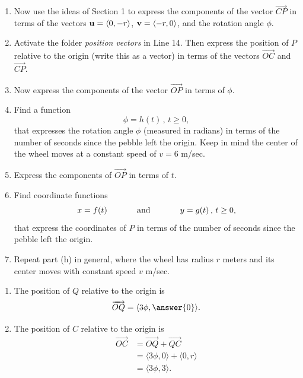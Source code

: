 \documentclass{ximera}
\begin{document}
\begin{question}
\begin{enumerate}
\item Now use the ideas of Section 1 to express the components of the vector $\overrightarrow{CP}$ in terms of the vectors ${\bf u}=\langle 0,-r \rangle$, ${\bf v}=\langle -r,0 \rangle $, and the rotation angle $\phi$.


\item Activate the folder \emph{position vectors} in Line 14. Then express the position of $P$ relative to the origin (write this as a vector) in terms of the vectors $\overrightarrow{OC}$ and $\overrightarrow{CP}$.

\item Now express the components of the vector $\overrightarrow{OP}$ in terms of $\phi$.

\item Find a function 
\[
   \phi = h(t)  \, , \, t\geq 0, 
\]
that expresses the rotation angle $\phi$ (measured in radians) in terms of the number of seconds since the pebble left the origin. Keep in mind the center of the wheel moves at a constant speed of $v=6$ m/sec.

\item Express the components of $\overrightarrow{OP}$ in terms of $t$.

\item Find coordinate functions
\[
    x=f(t)   \hskip 0.5in \text{and} \hskip 0.5in y=g(t) \, , \, t\geq 0 ,
\]
that express the coordinates of $P$ in terms of the number of seconds since the pebble left the origin.

\item Repeat part (h) in general, where the wheel has radius $r$ meters and its center moves with constant speed $v$ m/sec.
\end{enumerate}

\begin{explanation}
\begin{enumerate}
\item The position of $Q$ relative to the origin is
\[
  \overrightarrow{OQ} = \langle  3\phi , \answer{0} \rangle. 
\]

\item The position of $C$ relative to the origin is
\begin{align*}
        \overrightarrow{OC} &= \overrightarrow{OQ} + \overrightarrow{QC} \\     
                                      &=  \langle  3\phi , 0 \rangle + \langle 0,r \rangle \\
                                      &= \langle  3\phi , 3 \rangle  .
\end{align*}


\end{enumerate}
\end{explanation}
\end{question}
\end{document}
